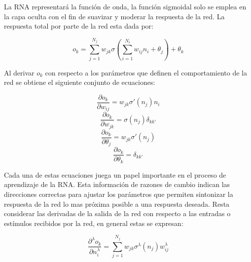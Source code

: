 La RNA representar\'a la funci\'on de onda, la funci\'on sigmoidal
solo se emplea en la capa oculta con el fin de suavizar
y moderar la respuesta de la red. La respuesta total por parte
de la red esta dada por:

\begin{equation}
	o_k=\sum^{N_j}_{j=1}w_{jk} \sigma \left(\sum^{N_i}_{i=1}w_{ij}n_i+\theta_j\right)+\theta_k
\end{equation}

Al derivar $o_k$ con respecto a los par\'ametros que definen
el comportamiento de la red se obtiene el siguiente conjunto
de ecuaciones:

\begin{equation}
	\frac{\partial o_k}{\partial w_{ij}}=w_{jk}\sigma' (n_j)n_i
	\label{derivativeOfO_kRespectW_ij}
\end{equation}
\begin{equation}
	\frac{\partial o_k}{\partial w_{jk}}=\sigma (n_j)\delta_{kk'}
	\label{derivativeOfO_kRespectW_jk}
\end{equation}
\begin{equation}
	\frac{\partial o_k}{\partial \theta_j}=w_{jk}\sigma' (n_j)
	\label{derivativeOfO_kRespectTheta_j}
\end{equation}
\begin{equation}
	\frac{\partial o_k}{\partial \theta_k}=\delta_{kk'}
	\label{derivativeOfO_kRespectTheta_k}
\end{equation}


Cada una de estas ecuaciones juega un papel importante
en el proceso de aprendizaje de la RNA. Esta informaci\'on
de razones de cambio indican las direcciones correctas para
ajustar los par\'ametros que permiten sintonizar la respuesta de
la red lo mas pr\'oxima posible a una respuesta deseada. Resta
considerar las derivadas de la salida de la red con respecto a
las entradas o est\'imulos recibidos por la red, en general estas
se expresan:

\begin{equation}
	\frac{\partial^\lambda o_k}{\partial n_i^\lambda}=\sum^{N_j}_{j=1}w_{jk}\sigma^\lambda(n_j)w_{ij}^\lambda
	\label{lamda}
\end{equation}
